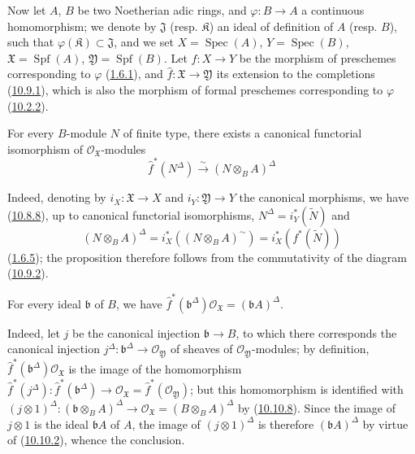 \begin{env}[10.10.7]
\label{I.10.10.7}
Now let $A$, $B$ be two Noetherian adic rings, and
$\varphi:B\to A$ a continuous homomorphism; we denote by
$\mathfrak{J}$ (resp. $\mathfrak{K}$) an ideal of definition of $A$
(resp. $B$), such that $\varphi(\mathfrak{K})\subset\mathfrak{J}$, and
we set $X=\operatorname{Spec}(A)$, $Y=\operatorname{Spec}(B)$,
$\mathfrak{X}=\operatorname{Spf}(A)$,
$\mathfrak{Y}=\operatorname{Spf}(B)$. Let $f:X\to Y$ be the morphism
of preschemes corresponding to $\varphi$
(\hyperref[I.1.6.1]{1.6.1}), and $\widehat f:\mathfrak{X}\to
\mathfrak{Y}$ its extension to the completions
(\hyperref[I.10.9.1]{10.9.1}), which is also the morphism of
formal preschemes corresponding to $\varphi$
(\hyperref[I.10.2.2]{10.2.2}).
\end{env}

\begin{proposition}[10.10.8]
\label{I.10.10.8}
For every $B$-module $N$ of finite type, there exists a canonical
functorial isomorphism of $\mathscr{O}_{\mathfrak{X}}$-modules
\[
  \widehat f^*(N^\Delta)
  \xrightarrow{\sim}
  (N\otimes_B A)^\Delta
\]
\end{proposition}

Indeed, denoting by $i_X:\mathfrak{X}\to X$ and
$i_Y:\mathfrak{Y}\to Y$ the canonical morphisms, we have
(\hyperref[I.10.8.8]{10.8.8}), up to canonical functorial
isomorphisms, $N^\Delta=i_Y^*(\widetilde N)$ and
\[
  (N\otimes_B A)^\Delta
  =i_X^*((N\otimes_B A)^{\sim})
  =i_X^*(f^*(\widetilde N))
\]
(\hyperref[I.1.6.5]{1.6.5}); the proposition therefore follows from
the commutativity of the diagram (\hyperref[I.10.9.2]{10.9.2}).

\begin{corollary}[10.10.9]
\label{I.10.10.9}
For every ideal $\mathfrak b$ of $B$, we have
$\widehat f^*(\mathfrak b^\Delta)\mathscr{O}_{\mathfrak{X}}
=(\mathfrak bA)^\Delta$.
\end{corollary}

Indeed, let $j$ be the canonical injection $\mathfrak b\to B$, to which
there corresponds the canonical injection
$j^\Delta:\mathfrak b^\Delta\to\mathscr{O}_{\mathfrak{Y}}$ of
sheaves of $\mathscr{O}_{\mathfrak{Y}}$-modules; by definition,
$\widehat f^*(\mathfrak b^\Delta)\mathscr{O}_{\mathfrak{X}}$ is
the image of the homomorphism
$\widehat f^*(j^\Delta):\widehat f^*(\mathfrak b^\Delta)\to
\mathscr{O}_{\mathfrak{X}}=\widehat f^*(\mathscr{O}_{\mathfrak{Y}})$;
but this homomorphism is identified with
$(j\otimes1)^\Delta:(\mathfrak b\otimes_B A)^\Delta\to
\mathscr{O}_{\mathfrak{X}}=(B\otimes_B A)^\Delta$ by
(\hyperref[I.10.10.8]{10.10.8}). Since the image of $j\otimes1$ is
the ideal $\mathfrak bA$ of $A$, the image of $(j\otimes1)^\Delta$ is
therefore $(\mathfrak bA)^\Delta$ by virtue of
(\hyperref[I.10.10.2]{10.10.2}), whence the conclusion.



